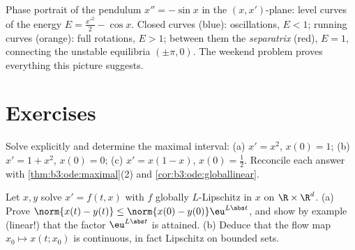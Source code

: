 \begin{omfigure}

{\small Phase portrait of the pendulum $x'' = -\sin x$ in the
$(x, x')$-plane: level curves of the energy $E = \frac{x'^2}2
- \cos x$. Closed curves (blue): oscillations, $E < 1$;
running curves (orange): full rotations, $E > 1$; between
them the \emph{separatrix} (red), $E = 1$, connecting the
unstable equilibria $(\pm\pi, 0)$. The weekend problem proves
everything this picture suggests.}
\end{omfigure}

\section{Exercises}

\begin{exercise}[$\star$]\label{exo:b3:ode:1}
Solve explicitly and determine the maximal interval:
(a) $x' = x^2$, $x(0) = 1$; (b) $x' = 1 + x^2$, $x(0) = 0$;
(c) $x' = x(1-x)$, $x(0) = \frac12$. Reconcile each answer
with \cref{thm:b3:ode:maximal}(2) and
\cref{cor:b3:ode:globallinear}.
\end{exercise}

\begin{exercise}[$\star$]\label{exo:b3:ode:2}
Let $x, y$ solve $x' = f(t,x)$ with $f$ globally
$L$-Lipschitz in $x$ on $\R\times\R^d$.
(a) Prove $\norm{x(t) - y(t)} \leq \norm{x(0) -
y(0)}\eu^{L\abs t}$, and show by example (linear!) that the
factor $\eu^{L\abs t}$ is attained.
(b) Deduce that the flow map $x_0 \mapsto x(t; x_0)$ is
continuous, in fact Lipschitz on bounded sets.
\end{exercise}

